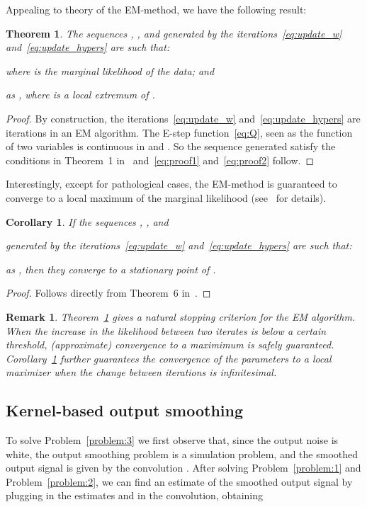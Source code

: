 \documentclass[10pt]{article}
\newtheorem{corollary}{Corollary}
\newtheorem{remark}{Remark}
\newtheorem{theorem}{Theorem}
\begin{document}
Appealing to theory of the EM-method, we have the following result:
\begin{theorem}\label{thm:1}
  The sequences , , and 
  generated by the iterations~\eqref{eq:update_w} and~\eqref{eq:update_hypers}
  are such that:
  
  where  is the marginal likelihood of
  the data; and
  
  as ,  where  is a local extremum of .
\end{theorem}
\begin{proof}
  By construction, the iterations~\eqref{eq:update_w} and~\eqref{eq:update_hypers} are iterations in an EM algorithm. The E-step function~\eqref{eq:Q}, seen as the function of two variables  is continuous in
   and . So the sequence generated satisfy the conditions in Theorem~1 in~\cite{wu1983convergence} and~\eqref{eq:proof1} and~\eqref{eq:proof2} follow.
\end{proof}
Interestingly, except for pathological cases, the EM-method is guaranteed to
converge to a local maximum of the marginal likelihood (see~\cite[Ch. 3]{mclachlan2007algorithm} for details).
\begin{corollary}\label{cor:1}
  If the sequences , , and
  
  generated by the iterations~\eqref{eq:update_w} and~\eqref{eq:update_hypers}
  are such that:
  
  as , then they converge to a stationary point of .
\end{corollary}
\begin{proof}
  Follows directly from Theorem~6 in~\cite{wu1983convergence}.
\end{proof}
\begin{remark}
  Theorem~\ref{thm:1} gives a natural stopping criterion for the EM algorithm.
  When the increase in the likelihood between two iterates is below a certain
  threshold, (approximate) convergence to a maximimum is safely guaranteed.
  Corollary~\ref{cor:1} further guarantees the convergence of the parameters to
  a local maximizer when the change between iterations is infinitesimal.
\end{remark}
\subsection{Kernel-based output smoothing}\label{sec:output}
To solve Problem~\ref{problem:3} we first observe that, since the output noise
is white, the output smoothing problem is a simulation problem, and the
smoothed output signal is given by the convolution .
After solving Problem~\ref{problem:1} and Problem~\ref{problem:2}, we can find
an estimate of the smoothed output signal  by plugging in the
estimates  and  in the convolution, obtaining
\end{document}
